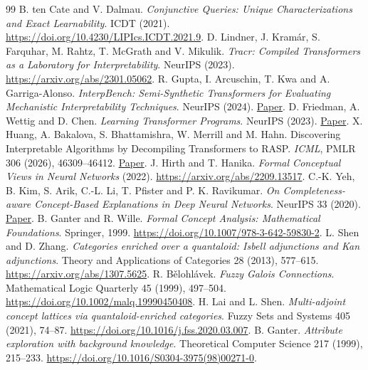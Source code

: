 \documentclass[11pt,a4paper]{article}
\theoremstyle{definition}
\theoremstyle{remark}\newaliascnt{remark}{theorem}
\numberwithin{equation}{section}
\begin{document}
\begin{thebibliography}{99}
 B. ten Cate and V. Dalmau. \emph{Conjunctive Queries: Unique Characterizations and Exact Learnability}. ICDT (2021). \url{https://doi.org/10.4230/LIPIcs.ICDT.2021.9}.
 D. Lindner, J. Kram\'ar, S. Farquhar, M. Rahtz, T. McGrath and V. Mikulik. \emph{Tracr: Compiled Transformers as a Laboratory for Interpretability}. NeurIPS (2023). \url{https://arxiv.org/abs/2301.05062}.
 R. Gupta, I. Arcuschin, T. Kwa and A. Garriga-Alonso. \emph{InterpBench: Semi-Synthetic Transformers for Evaluating Mechanistic Interpretability Techniques}. NeurIPS (2024). \href{https://proceedings.neurips.cc/paper_files/paper/2024/hash/a8f7d43ae092d9a5295775eb17f3f4f7-Abstract-Datasets_and_Benchmarks_Track.html}{Paper}.
 D. Friedman, A. Wettig and D. Chen. \emph{Learning Transformer Programs}. NeurIPS (2023). \href{https://proceedings.neurips.cc/paper_files/paper/2023/hash/995f693b73050f90977ed2828202645c-Abstract-Conference.html}{Paper}.
 X. Huang, A. Bakalova, S. Bhattamishra, W. Merrill and M. Hahn. Discovering Interpretable Algorithms by Decompiling Transformers to RASP. \emph{ICML}, PMLR 306 (2026), 46309--46412. \href{https://proceedings.mlr.press/v306/huang26b.html}{Paper}.
 J. Hirth and T. Hanika. \emph{Formal Conceptual Views in Neural Networks} (2022). \url{https://arxiv.org/abs/2209.13517}.
 C.-K. Yeh, B. Kim, S. Arik, C.-L. Li, T. Pfister and P. K. Ravikumar. \emph{On Completeness-aware Concept-Based Explanations in Deep Neural Networks}. NeurIPS 33 (2020). \href{https://proceedings.neurips.cc/paper/2020/hash/ecb287ff763c169694f682af52c1f309-Abstract.html}{Paper}.
 B. Ganter and R. Wille. \emph{Formal Concept Analysis: Mathematical Foundations}. Springer, 1999. \url{https://doi.org/10.1007/978-3-642-59830-2}.
 L. Shen and D. Zhang. \emph{Categories enriched over a quantaloid: Isbell adjunctions and Kan adjunctions}. Theory and Applications of Categories 28 (2013), 577--615. \url{https://arxiv.org/abs/1307.5625}.
 R. B\v{e}lohl\'avek. \emph{Fuzzy Galois Connections}. Mathematical Logic Quarterly 45 (1999), 497--504. \url{https://doi.org/10.1002/malq.19990450408}.
 H. Lai and L. Shen. \emph{Multi-adjoint concept lattices via quantaloid-enriched categories}. Fuzzy Sets and Systems 405 (2021), 74--87. \url{https://doi.org/10.1016/j.fss.2020.03.007}.
 B. Ganter. \emph{Attribute exploration with background knowledge}. Theoretical Computer Science 217 (1999), 215--233. \url{https://doi.org/10.1016/S0304-3975(98)00271-0}.

\end{thebibliography}
\end{document}
